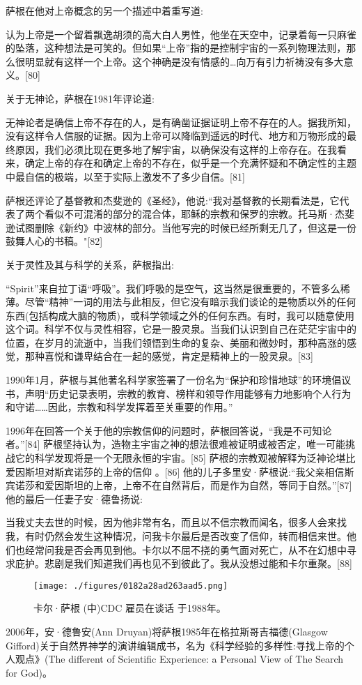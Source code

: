 萨根在他对上帝概念的另一个描述中着重写道:

认为上帝是一个留着飘逸胡须的高大白人男性，他坐在天空中，记录着每一只麻雀的坠落，这种想法是可笑的。但如果“上帝”指的是控制宇宙的一系列物理法则，那么很明显就有这样一个上帝。这个神确是没有情感的…向万有引力祈祷没有多大意义。[80]

关于无神论，萨根在1981年评论道:

无神论者是确信上帝不存在的人，是有确凿证据证明上帝不存在的人。据我所知，没有这样令人信服的证据。因为上帝可以降临到遥远的时代、地方和万物形成的最终原因，我们必须比现在更多地了解宇宙，以确保没有这样的上帝存在。在我看来，确定上帝的存在和确定上帝的不存在，似乎是一个充满怀疑和不确定性的主题中最自信的极端，以至于实际上激发不了多少自信。[81]

萨根还评论了基督教和杰斐逊的《圣经》，他说:“我对基督教的长期看法是，它代表了两个看似不可混淆的部分的混合体，耶稣的宗教和保罗的宗教。托马斯·杰斐逊试图删除《新约》中波林的部分。当他写完的时候已经所剩无几了，但这是一份鼓舞人心的书稿。"[82]

关于灵性及其与科学的关系，萨根指出:

“Spirit”来自拉丁语“呼吸”。我们呼吸的是空气，这当然是很重要的，不管多么稀薄。尽管“精神”一词的用法与此相反，但它没有暗示我们谈论的是物质以外的任何东西(包括构成大脑的物质)，或科学领域之外的任何东西。有时，我可以随意使用这个词。科学不仅与灵性相容，它是一股灵泉。当我们认识到自己在茫茫宇宙中的位置，在岁月的流逝中，当我们领悟到生命的复杂、美丽和微妙时，那种高涨的感觉，那种喜悦和谦卑结合在一起的感觉，肯定是精神上的一股灵泉。[83]

1990年1月，萨根与其他著名科学家签署了一份名为“保护和珍惜地球”的环境倡议书，声明“历史记录表明，宗教的教育、榜样和领导作用能够有力地影响个人行为和守诺……因此，宗教和科学发挥着至关重要的作用。”

1996年在回答一个关于他的宗教信仰的问题时，萨根回答说，“我是不可知论者。”[84] 萨根坚持认为，造物主宇宙之神的想法很难被证明或被否定，唯一可能挑战它的科学发现将是一个无限永恒的宇宙。[85] 萨根的宗教观被解释为泛神论堪比爱因斯坦对斯宾诺莎的上帝的信仰 。[86] 他的儿子多里安·萨根说:“我父亲相信斯宾诺莎和爱因斯坦的上帝，上帝不在自然背后，而是作为自然，等同于自然。”[87] 他的最后一任妻子安·德鲁扬说:

当我丈夫去世的时候，因为他非常有名，而且以不信宗教而闻名，很多人会来找我，有时仍然会发生这种情况，问我卡尔最后是否改变了信仰，转而相信来世。他们也经常问我是否会再见到他。卡尔以不屈不挠的勇气面对死亡，从不在幻想中寻求庇护。悲剧是我们知道我们再也见不到彼此了。我从没想过能和卡尔重聚。[88]
\begin{figure}[ht]
\centering
\texttt{[image: ./figures/0182a28ad263aad5.png]}
\caption{卡尔·萨根 (中)CDC 雇员在谈话 于1988年。} \label{fig_Sagan_9}
\end{figure}
2006年，安·德鲁安(Ann Druyan)将萨根1985年在格拉斯哥吉福德(Glasgow Gifford)关于自然界神学的演讲编辑成书，名为《科学经验的多样性:寻找上帝的个人观点》(The different of Scientific Experience: a Personal View of The Search for God)。

